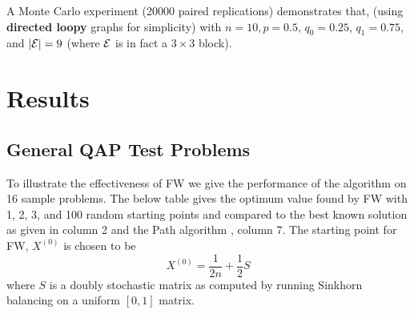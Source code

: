 

A Monte Carlo experiment (20000 paired replications) demonstrates that, (using {\bf directed loopy} graphs for simplicity) with
$n=10, p=0.5$, $q_0=0.25$, $q_1=0.75$, and $|\mathcal{E}|=9$ (where $\mathcal{E}$ is in fact a $3 \times 3$ block).




\section{Results} %
\label{sec:results}


\subsection{General QAP Test Problems}
To illustrate the effectiveness of FW 
we give the performance of the algorithm on 16 sample problems.  The below table gives the optimum value found by FW with 1, 2, 3, and 100 random starting points   and compared 
to the best known solution as given in column 2 and the Path algorithm  \cite{Path:2009}, column 7.   The starting point for FW, $X^{(0)}$ is chosen to be
$$X^{(0)}=\frac {1}{2n} + \frac{1}{2} S$$
where $S$ is a doubly stochastic matrix as computed by running Sinkhorn balancing on a uniform $[0,1]$ matrix.

